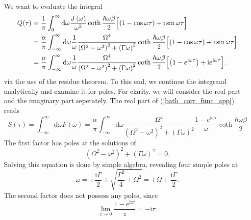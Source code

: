 We want to evaluate the integral 
%
\begin{align}\label{bath_corr_func_app}
\begin{split}
    Q (\tau)
    &= \frac{1}{\pi} \int_{0}^{\infty} \text{d}\omega \frac{J \left( \omega \right)}{\omega^2}
    \coth\frac{\hbar\omega\beta}{2} \Bigl[ \left( 1-\cos\omega\tau \right) + \text{i}\sin\omega\tau \Bigr] \\
    &= \frac{\alpha}{\pi} 
    \int_{-\infty}^{\infty} \text{d}\omega \frac{1}{\omega} \frac{\Omega^4}{\left(\Omega^2-\omega^2\right)^2
    + \left(\Gamma\omega\right)^2}
    \coth\frac{\hbar\omega\beta}{2} \Bigl[ \left( 1-\cos\omega\tau \right) + \text{i}\sin\omega\tau \Bigr] \\
    &= \frac{\alpha}{\pi} 
    \int_{-\infty}^{\infty} \text{d}\omega \frac{1}{\omega} \frac{\Omega^4}{\left(\Omega^2-\omega^2\right)^2
    + \left(\Gamma\omega\right)^2}
    \coth\frac{\hbar\omega\beta}{2} \Bigl[ \left( 1-e^{\text{i}\omega\tau} \right) + \text{i}e^{\text{i}\omega\tau} \Bigr].
\end{split}
\end{align}
%
via the use of the residue theorem. To this end, we continue the integrand analytically 
and examine it for poles. For clarity, we will consider the real part and the imaginary
part seperately. The real part of (\ref{bath_corr_func_app}) reads
%
\begin{equation}\label{bath_corr_func_real_part_app}
    S(\tau)=\int_{-\infty}^{\infty}\text{d}\omega F(\omega)
    =\frac{\alpha}{\pi}\int_{-\infty}^{\infty}\text{d}\omega
    \frac{\Omega^4}{\left(\Omega^2-\omega^2\right)^2+\left(\Gamma\omega\right)^2}
    \frac{1-e^{\text{i}\omega\tau}}{\omega}\coth\frac{\hbar\omega\beta}{2}
\end{equation}
%
The first factor has poles at the solutions of
%
\begin{equation}
    \left(\Omega^2-\omega^2\right)^2+\left(\Gamma\omega\right)^2=0.
\end{equation}
%
Solving this equation is done by simple algebra, revealing four simple poles at
%
\begin{equation}
    \omega=\pm\frac{\text{i} \Gamma}{2}\pm\sqrt{\frac{\Gamma^2}{4}+\Omega^2}
    =\pm\bar{\Omega}\pm\frac{\text{i}\Gamma}{2}.
\end{equation}
%
The second factor does not possess any poles, since
\begin{equation}
    \lim_{z\rightarrow0}\frac{1-e^{\text{i}z\tau}}{z} =-\text{i}\tau.
\end{equation}
